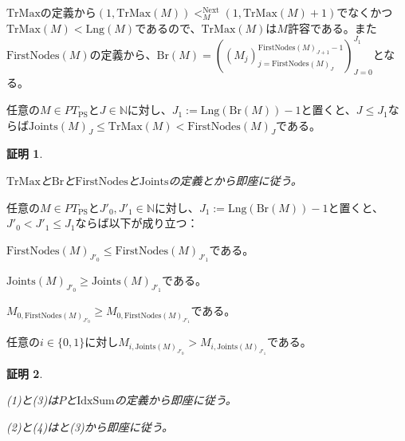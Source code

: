 \documentclass[dvipdfmx,uplatex]{jsarticle}
\theoremstyle{customnonumberbreakfortheorem}
\theoremstyle{customnonumberbreakforproof}
\newtheorem{hideableproof}{証明}
\begin{document}
\(\textrm{TrMax}\)の定義から\((1,\textrm{TrMax}(M)) <_M^{\textrm{Next}} (1,\textrm{TrMax}(M)+1)\)でなくかつ\(\textrm{TrMax}(M) < \textrm{Lng}(M)\)であるので、\(\textrm{TrMax}(M)\)は\(M\)許容である。また\(\textrm{FirstNodes}(M)\)の定義から、\(\textrm{Br}(M) = ((M_j)_{j = \textrm{FirstNodes}(M)_J}^{\textrm{FirstNodes}(M)_{J+1}-1})_{J=0}^{J_1}\)となる。

\begin{proposition}\label{FirstNodesとTrMaxとJointsの関係}
	任意の\(M \in PT_{\textrm{PS}}\)と\(J \in \mathbb{N}\)に対し、\(J_1 := \textrm{Lng}(\textrm{Br}(M))-1\)と置くと、\(J \leq J_1\)ならば\(\textrm{Joints}(M)_J \leq \textrm{TrMax}(M) < \textrm{FirstNodes}(M)_J\)である。
\end{proposition}

\begin{hideableproof}
	\begin{indented}
		\item \(\textrm{TrMax}\)と\(\textrm{Br}\)と\(\textrm{FirstNodes}\)と\(\textrm{Joints}\)の定義とから即座に従う。
	\end{indented}
\end{hideableproof}

\begin{corollary}\label{FirstNodesとJointsの単調性}
	任意の\(M \in PT_{\textrm{PS}}\)と\(J'_0,J'_1 \in \mathbb{N}\)に対し、\(J_1 := \textrm{Lng}(\textrm{Br}(M))-1\)と置くと、\(J'_0 < J'_1 \leq J_1\)ならば以下が成り立つ：
	\begin{penumerate}
		\item \(\textrm{FirstNodes}(M)_{J'_0} \leq \textrm{FirstNodes}(M)_{J'_1}\)である。
		\item \(\textrm{Joints}(M)_{J'_0} \geq \textrm{Joints}(M)_{J'_1}\)である。
		\item \(M_{0,\textrm{FirstNodes}(M)_{J'_0}} \geq M_{0,\textrm{FirstNodes}(M)_{J'_1}}\)である。
		\item 任意の\(i \in \{0,1\}\)に対し\(M_{i,\textrm{Joints}(M)_{J'_0}} > M_{i,\textrm{Joints}(M)_{J'_1}}\)である。
	\end{penumerate}
\end{corollary}

\begin{hideableproof}
	\begin{indented}
		\item (1)と(3)は\(P\)と\(\textrm{IdxSum}\)の定義から即座に従う。
		\item (2)と(4)はと(3)から即座に従う。
	\end{indented}
\end{hideableproof}
\end{document}
